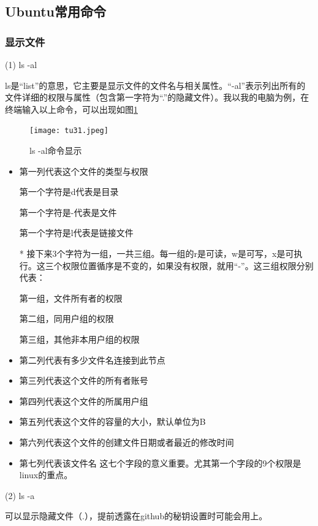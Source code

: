 \documentclass{article}
\begin{document}
\subsection{Ubuntu常用命令}
\subsubsection{显示文件}
 (1) ls -al

ls是“list”的意思，它主要是显示文件的文件名与相关属性。“-al”表示列出所有的文件详细的权限与属性（包含第一字符为“.”的隐藏文件）。我以我的电脑为例，在终端输入以上命令，可以出现如图\ref{tu31}
\begin{figure}[!htb] %
\centering
\texttt{[image: tu31.jpeg]}
\caption{\small ls -al命令显示}
\label{tu31}
\end{figure} 
\begin{itemize}

\item 第一列代表这个文件的类型与权限

第一个字符是d代表是目录

第一个字符是-代表是文件

第一个字符是l代表是链接文件
\item[*] 接下来3个字符为一组，一共三组。每一组的r是可读，w是可写，x是可执行。这三个权限位置循序是不变的，如果没有权限，就用“-”。这三组权限分别代表：

第一组，文件所有者的权限

第二组，同用户组的权限

第三组，其他非本用户组的权限

\item  第二列代表有多少文件名连接到此节点

\item  第三列代表这个文件的所有者账号

\item  第四列代表这个文件的所属用户组

\item  第五列代表这个文件的容量的大小，默认单位为B

\item  第六列代表这个文件的创建文件日期或者最近的修改时间

\item  第七列代表该文件名
这七个字段的意义重要。尤其第一个字段的9个权限是linux的重点。

\end{itemize}

(2) ls -a

可以显示隐藏文件（.），提前透露在github的秘钥设置时可能会用上。
\end{document}
